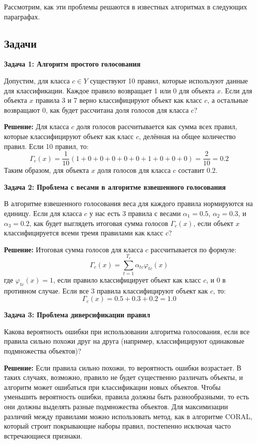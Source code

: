 Рассмотрим, как эти проблемы решаются в известных алгоритмах в следующих параграфах.

\subsection{Задачи}

\textbf{Задача 1: Алгоритм простого голосования}

Допустим, для класса $c \in Y$ существуют 10 правил, которые используют данные для классификации. Каждое правило возвращает 1 или 0 для объекта $x$. Если для объекта $x$ правила 3 и 7 верно классифицируют объект как класс $c$, а остальные возвращают 0, как будет рассчитана доля голосов для класса $c$?

\textbf{Решение:}
Для класса $c$ доля голосов рассчитывается как сумма всех правил, которые классифицируют объект как класс $c$, делённая на общее количество правил. Если 10 правил, то:
\[
    \Gamma_c(x) = \frac{1}{10} \left( 1 + 0 + 0 + 0 + 0 + 0 + 1 + 0 + 0 + 0 \right) = \frac{2}{10} = 0.2
\]
Таким образом, для объекта $x$ доля голосов для класса $c$ составит 0.2.

\textbf{Задача 2: Проблема с весами в алгоритме взвешенного голосования}

В алгоритме взвешенного голосования веса для каждого правила нормируются на единицу. Если для класса $c$ у нас есть 3 правила с весами $\alpha_1 = 0.5$, $\alpha_2 = 0.3$, и $\alpha_3 = 0.2$, как будет выглядеть итоговая сумма голосов $\Gamma_c(x)$, если объект $x$ классифицируется всеми тремя правилами как класс $c$?

\textbf{Решение:}
Итоговая сумма голосов для класса $c$ рассчитывается по формуле:
\[
    \Gamma_c(x) = \sum_{t=1}^{T_c} \alpha_{tc} \varphi_{tc}(x)
\]
где $\varphi_{tc}(x) = 1$, если правило классифицирует объект как класс $c$, и 0 в противном случае. Если все 3 правила классифицируют объект как $c$, то:
\[
    \Gamma_c(x) = 0.5 + 0.3 + 0.2 = 1.0
\]

\textbf{Задача 3: Проблема диверсификации правил}

Какова вероятность ошибки при использовании алгоритма голосования, если все правила сильно похожи друг на друга (например, классифицируют одинаковые подмножества объектов)?

\textbf{Решение:}
Если правила сильно похожи, то вероятность ошибки возрастает. В таких случаях, возможно, правило не будет существенно различать объекты, и алгоритм может ошибаться при классификации новых объектов. Чтобы уменьшить вероятность ошибки, правила должны быть разнообразными, то есть они должны выделять разные подмножества объектов. Для максимизации различий между правилами можно использовать метод, как в алгоритме CORAL, который строит покрывающие наборы правил, постепенно исключая часто встречающиеся признаки.

